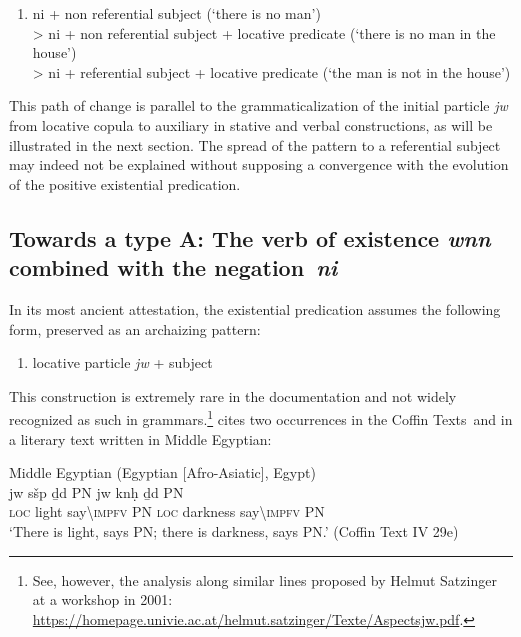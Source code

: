 \documentclass[output=paper]{langsci/langscibook}
\newcommand{\ꜥ}{ʿ}
\newcommand{\ꜣ}{\kern-.25pt\texttt{ꜣ}\kern-.6pt}
\begin{document}
\begin{enumerate}[label=(\roman*), resume] %
	\item ni + non referential subject (`there is no man')\\
	> ni + non referential subject + locative predicate (`there is no man in the house')\\
	> ni + referential subject + locative predicate (`the man is not in the house')
\end{enumerate}

This path of change is parallel to the grammaticalization of the initial particle \textit{jw} from locative copula to auxiliary in stative and verbal constructions, as will be illustrated in the next section. The spread of the pattern to a referential subject may indeed not be explained without supposing a convergence with the evolution of the positive existential predication.

\subsection{Towards a type A: The verb of existence \textit{wnn} combined with the negation \textit{ni}}\label{s:AE2-2}

In its most ancient attestation, the existential predication assumes the following form, preserved as an archaizing pattern: 

\begin{enumerate}[label=(\roman*), resume] %
	\item locative particle \textit{jw} + subject	
\end{enumerate}

This construction is extremely rare in the documentation and not widely recognized as such in grammars.\footnote{See, however, the analysis along similar lines proposed by Helmut Satzinger at a workshop in 2001: \url{https://homepage.univie.ac.at/helmut.satzinger/Texte/Aspectsjw.pdf}.} \citet[122]{Loprieno1995} cites two occurrences in the Coffin Texts and in a literary text written in Middle Egyptian:

\ea Middle Egyptian (Egyptian [Afro-Asiatic], Egypt) \label{ex:AE14}\\
	\gll jw sšp ḏd PN jw knḥ ḏd PN\\
	\textsc{loc} light say\textbackslash\textsc{impfv} PN \textsc{loc} darkness say\textbackslash\textsc{impfv} PN\\
	\glt ‘There is light, says PN; there is darkness, says PN.’ (Coffin Text IV 29e)
\z 
\end{document}
